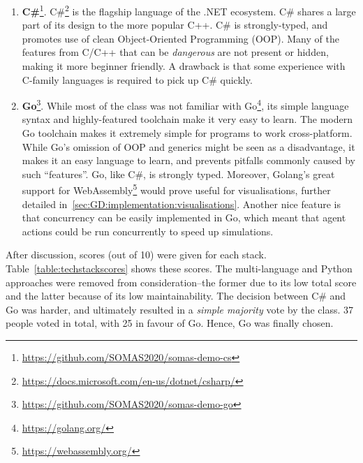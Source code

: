 \begin{enumerate}
    \item \textbf{C\#}\footnote{\url{https://github.com/SOMAS2020/somas-demo-cs}}.
          C\#\footnote{\url{https://docs.microsoft.com/en-us/dotnet/csharp/}} is the flagship language of the .NET ecosystem. C\# shares a large part of its design to the more popular C++. C\# is strongly-typed, and promotes use of clean Object-Oriented Programming (OOP). Many of the features from C/C++ that can be \emph{dangerous} are not present or hidden, making it more beginner friendly. A drawback is that some experience with C-family languages is required to pick up C\# quickly.

    \item \textbf{Go}\footnote{\url{https://github.com/SOMAS2020/somas-demo-go}}.
          While most of the class was not familiar with Go\footnote{\url{https://golang.org/}}, its simple language syntax and highly-featured toolchain make it very easy to learn. The modern Go toolchain makes it extremely simple for programs to work cross-platform. While Go's omission of OOP and generics might be seen as a disadvantage, it makes it an easy language to learn, and prevents pitfalls commonly caused by such ``features''. Go, like C\#, is strongly typed. Moreover, Golang's great support for WebAssembly\footnote{\url{https://webassembly.org/}} would prove useful for visualisations, further detailed in~\ref{sec:GD:implementation:visualisations}. Another nice feature is that concurrency can be easily implemented in Go, which meant that agent actions could be run concurrently to speed up simulations.
\end{enumerate}

After discussion, scores (out of 10) were given for each stack. Table~\ref{table:techstackscores} shows these scores. The multi-language and Python approaches were removed from consideration--the former due to its low total score and the latter because of its low maintainability. The decision between C\# and Go was harder, and ultimately resulted in a \emph{simple majority} vote by the class. 37 people voted in total, with 25 in favour of Go. Hence, Go was finally chosen.

